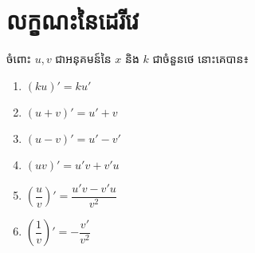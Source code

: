 \documentclass[a4paper,12pt]{article}
\begin{document}
\section{លក្ខណះនៃដេរីវេ}
ចំពោះ $u,v$ ជាអនុគមន៍នៃ $x$ និង $k$ ជាចំនួនថេ នោះគេបាន៖
\begin{multicols}{3}
	\begin{enumerate}
		\item $(ku)'=ku'$
		\item $(u+ v)'=u'+ v$
		\item $(u-v)'=u'-v'$
		\item $(uv)'=u'v+v'u$
		\item $\left(\dfrac{u}{v}\right)'=\dfrac{u'v-v'u}{v^2}$
		\item $\left(\dfrac{1}{v}\right)'=-\dfrac{v'}{v^2}$
	\end{enumerate}
\end{multicols}
\solution
\end{document}
